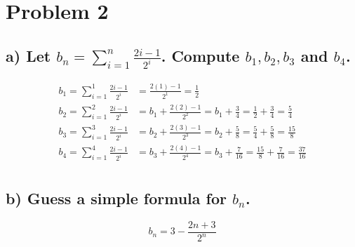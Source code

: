 \documentclass[11pt, letterpaper]{article}
\begin{document}
\section*{Problem 2}

\subsection*{a) Let $b_n=\sum_{i=1}^n \frac{2i-1}{2^i}$. Compute $b_1, b_2, b_3$ and $b_4$. }
\begin{align*}
    b_1=\sum_{i=1}^1 \frac{2i-1}{2^i} &= \frac{2(1)-1}{2^1}=\frac{1}{2}\\
    b_2=\sum_{i=1}^2 \frac{2i-1}{2^i} &= b_1 + \frac{2(2)-1}{2^2}=b_1+\frac{3}{4}=\frac{1}{2}+\frac{3}{4}=\frac{5}{4}\\
    b_3=\sum_{i=1}^3 \frac{2i-1}{2^i} &= b_2 + \frac{2(3)-1}{2^3}=b_2+\frac{5}{8}=\frac{5}{4}+\frac{5}{8}=\frac{15}{8}\\
    b_4=\sum_{i=1}^4 \frac{2i-1}{2^i} &= b_3 + \frac{2(4)-1}{2^4}=b_3+\frac{7}{16}=\frac{15}{8}+\frac{7}{16}=\frac{37}{16}\\
\end{align*}
\subsection*{b) Guess a simple formula for $b_n$.}
\[b_n=3-\frac{2n+3}{2^n}\]
\end{document}
